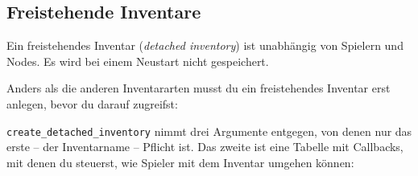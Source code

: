 \begin{Shaded}
\begin{Highlighting}[]
  \OperatorTok{=} \OperatorTok{(\{}
     \OperatorTok{=} \OperatorTok{,}
     \OperatorTok{=} \OperatorTok{,}
\OperatorTok{\})}
  \OperatorTok{=} \OperatorTok{:}\OperatorTok{()}
\end{Highlighting}
\end{Shaded}

\subsection{Freistehende Inventare}\label{freistehende-inventare}

Ein freistehendes Inventar (\emph{detached inventory}) ist unabhängig
von Spielern und Nodes. Es wird bei einem Neustart nicht gespeichert.

\begin{Shaded}
\begin{Highlighting}[]
  \OperatorTok{=} \OperatorTok{(\{}
     \OperatorTok{=} \OperatorTok{,}
     \OperatorTok{=} \OperatorTok{,}
\OperatorTok{\})}
\end{Highlighting}
\end{Shaded}

Anders als die anderen Inventararten musst du ein freistehendes Inventar
erst anlegen, bevor du darauf zugreifst:

\begin{Shaded}
\begin{Highlighting}[]
\OperatorTok{(}\OperatorTok{)}
\end{Highlighting}
\end{Shaded}

\texttt{create\_\allowbreak{}detached\_\allowbreak{}inventory} nimmt
drei Argumente entgegen, von denen nur das erste -- der Inventarname --
Pflicht ist. Das zweite ist eine Tabelle mit
Callbacks, mit denen du steuerst, wie Spieler
mit dem Inventar umgehen können:

